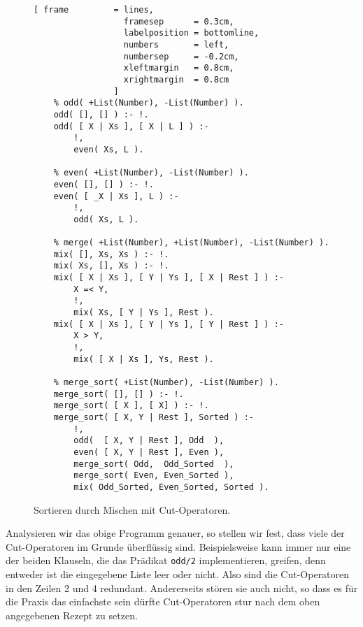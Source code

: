 \begin{figure}[!h]
  \centering
\begin{Verbatim}[ frame         = lines, 
                  framesep      = 0.3cm, 
                  labelposition = bottomline,
                  numbers       = left,
                  numbersep     = -0.2cm,
                  xleftmargin   = 0.8cm,
                  xrightmargin  = 0.8cm
                ]
    % odd( +List(Number), -List(Number) ).    
    odd( [], [] ) :- !.    
    odd( [ X | Xs ], [ X | L ] ) :-
        !,
        even( Xs, L ).

    % even( +List(Number), -List(Number) ).
    even( [], [] ) :- !.
    even( [ _X | Xs ], L ) :-
        !,
        odd( Xs, L ).
    
    % merge( +List(Number), +List(Number), -List(Number) ).
    mix( [], Xs, Xs ) :- !.    
    mix( Xs, [], Xs ) :- !.
    mix( [ X | Xs ], [ Y | Ys ], [ X | Rest ] ) :-
        X =< Y,
        !,
        mix( Xs, [ Y | Ys ], Rest ).
    mix( [ X | Xs ], [ Y | Ys ], [ Y | Rest ] ) :-
        X > Y,
        !,
        mix( [ X | Xs ], Ys, Rest ).
    
    % merge_sort( +List(Number), -List(Number) ).
    merge_sort( [], [] ) :- !.
    merge_sort( [ X ], [ X] ) :- !.
    merge_sort( [ X, Y | Rest ], Sorted ) :-
        !,
        odd(  [ X, Y | Rest ], Odd  ),
        even( [ X, Y | Rest ], Even ),
        merge_sort( Odd,  Odd_Sorted  ),
        merge_sort( Even, Even_Sorted ),
        mix( Odd_Sorted, Even_Sorted, Sorted ).
\end{Verbatim}
\vspace*{-0.3cm}
  \caption{Sortieren durch Mischen mit Cut-Operatoren.}
  \label{fig:merge-sort-cut}
\end{figure}

Analysieren wir das obige Programm genauer, so stellen wir fest, dass viele der
Cut-Operatoren im Grunde \"{u}berfl\"{u}ssig sind.  Beispielsweise kann immer nur eine der beiden
Klauseln, die das Pr\"{a}dikat \texttt{odd/2} implementieren, greifen, denn entweder ist die
eingegebene Liste leer oder nicht.  Also sind die Cut-Operatoren in den Zeilen 2 und 4
redundant.  Andererseits st\"{o}ren sie auch nicht, so dass es f\"{u}r die Praxis das einfachste
sein d\"{u}rfte Cut-Operatoren stur nach dem oben angegebenen Rezept zu setzen.
\pagebreak

\vspace*{\fill}

